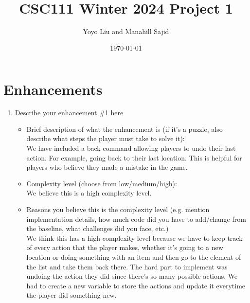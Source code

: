 \documentclass[11pt]{article}
\title{CSC111 Winter 2024 Project 1}
\author{Yoyo Liu and Manahill Sajid}
\date{\today}
\begin{document}
\maketitle

\section*{Enhancements}


\begin{enumerate}

\item Describe your enhancement \#1 here
	\begin{itemize}
	\item Brief description of what the enhancement is (if it's a puzzle, also describe what steps the player must take to solve it):
    \\ We have included a back command allowing players to undo their last action. For example, going back to their last location. This is helpful for players who believe they made a mistake in the game.
	\item Complexity level (choose from low/medium/high):
    \\ We believe this is a high complexity level.
	\item Reasons you believe this is the complexity level (e.g. mention implementation details, how much code did you have to add/change from the baseline, what challenges did you face, etc.)
	 \\We think this has a high complexity level because we have to keep track of every action that the player makes, whether it's going to a new location or doing something with an item and then go to the element of the list and take them back there. The hard part to implement was undoing the action they did since there's so many possible actions. We had to create a new variable to store the actions and update it everytime the player did something new.
	\end{itemize}


\end{enumerate}
\end{document}
